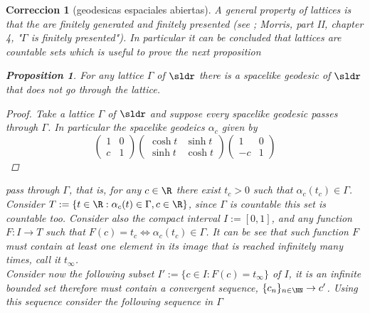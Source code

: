 \documentclass[11pt]{amsart}
\newtheorem{correccion}{Correccion}
\theoremstyle{plain}
\newtheorem{prop}[thm]{Proposition}
\theoremstyle{definition}
\theoremstyle{remark}
\begin{document}
\begin{correccion}[geodesicas espaciales abiertas]
A general property of lattices is that the are finitely generated and finitely presented (see \cite{DM}; Morris, part II, chapter 4, "$\Gamma$ is finitely presented"). In particular it can be concluded that lattices are countable sets which is useful to prove the next proposition

\begin{prop}
For any lattice $\Gamma$ of $\sldr$ there is a spacelike geodesic of $\sldr$ that does not go through the lattice.
\end{prop}

\begin{proof}
Take a lattice $\Gamma$ of $\sldr$ and suppose every spacelike geodesic passes through $\Gamma$. In particular the spacelike geodeics $\alpha_c$ given by $$ \left( \begin{matrix} 1 & 0 \\ c & 1  \end{matrix} \right) \left( \begin{matrix} \cosh{t} & \sinh{t} \\ \sinh{t} & \cosh{t}  \end{matrix} \right) \left( \begin{matrix} 1 & 0 \\ -c & 1  \end{matrix} \right) $$
\end{proof}
pass through $\Gamma$, that is, for any $c \in \R$ there exist $t_c > 0$ such that $\alpha_{c}(t_c) \in \Gamma$. Consider $T:= \{ t \in \R : \alpha_c(t) \in \Gamma, c \in \R  \} $, since $\Gamma$ is countable this set is countable too. Consider also the compact interval $I:=[0,1]$, and any function $F: I \to T$  such that $F(c) = t_c \iff \alpha_c(t_c) \in \Gamma$. It can be see that such function $F$ must contain at least one element in its image that is reached infinitely many times, call it $t_\infty$.\\

Consider now the following subset $I':= \{ c \in I : F(c)=t_\infty \}$ of $I$, it is an infinite bounded set therefore must contain a convergent sequence, $ \{ c_n \}_{n \in \NN} \to c' $. Using this sequence consider the following sequence in $\Gamma$


\end{correccion}
\end{document}
